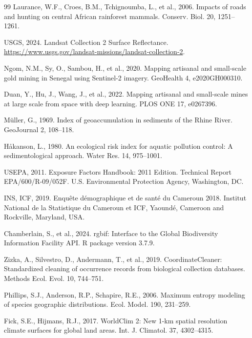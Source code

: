 \documentclass[preprint,12pt,authoryear]{elsarticle}
\begin{document}
\begin{thebibliography}{99}
Laurance, W.F., Croes, B.M., Tchignoumba, L., et al., 2006. Impacts of roads and hunting on central African rainforest mammals. Conserv. Biol. 20, 1251--1261.

USGS, 2024. Landsat Collection 2 Surface Reflectance. \url{https://www.usgs.gov/landsat-missions/landsat-collection-2}.

Ngom, N.M., Sy, O., Sambou, H., et al., 2020. Mapping artisanal and small-scale gold mining in Senegal using Sentinel-2 imagery. GeoHealth 4, e2020GH000310.

Duan, Y., Hu, J., Wang, J., et al., 2022. Mapping artisanal and small-scale mines at large scale from space with deep learning. PLOS ONE 17, e0267396.

M\"{u}ller, G., 1969. Index of geoaccumulation in sediments of the Rhine River. GeoJournal 2, 108--118.

H\r{a}kanson, L., 1980. An ecological risk index for aquatic pollution control: A sedimentological approach. Water Res. 14, 975--1001.

USEPA, 2011. Exposure Factors Handbook: 2011 Edition. Technical Report EPA/600/R-09/052F. U.S. Environmental Protection Agency, Washington, DC.

INS, ICF, 2019. Enqu\^{e}te d\'{e}mographique et de sant\'{e} du Cameroun 2018. Institut National de la Statistique du Cameroun et ICF, Yaound\'{e}, Cameroon and Rockville, Maryland, USA.

Chamberlain, S., et al., 2024. rgbif: Interface to the Global Biodiversity Information Facility API. R package version 3.7.9.

Zizka, A., Silvestro, D., Andermann, T., et al., 2019. CoordinateCleaner: Standardized cleaning of occurrence records from biological collection databases. Methods Ecol. Evol. 10, 744--751.

Phillips, S.J., Anderson, R.P., Schapire, R.E., 2006. Maximum entropy modeling of species geographic distributions. Ecol. Model. 190, 231--259.

Fick, S.E., Hijmans, R.J., 2017. WorldClim 2: New 1-km spatial resolution climate surfaces for global land areas. Int. J. Climatol. 37, 4302--4315.


\end{thebibliography}
\end{document}
